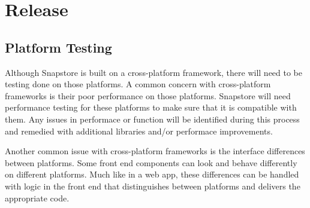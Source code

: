 \section{Release}

\subsection{Platform Testing}

Although Snapstore is built on a cross-platform framework, there will need to be testing done on those platforms. A common concern with cross-platform frameworks is their poor performance on those platforms. Snapstore will need performance testing for these platforms to make sure that it is compatible with them. Any issues in performace or function will be identified during this process and remedied with additional libraries and/or performace improvements.

Another common issue with cross-platform frameworks is the interface differences between platforms. Some front end components can look and behave differently on different platforms. Much like in a web app, these differences can be handled with logic in the front end that distinguishes between platforms and delivers the appropriate code.